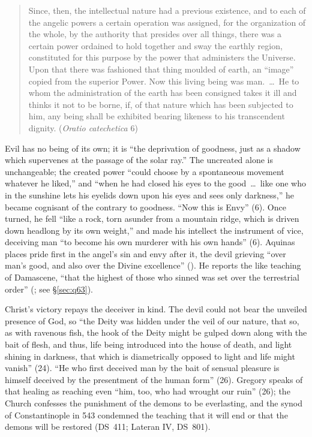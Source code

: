 \begin{quote}
Since, then, the intellectual nature had a previous existence, and to
each of the angelic powers a certain operation was assigned, for the
organization of the whole, by the authority that presides over all
things, there was a certain power ordained to hold together and sway the
earthly region, constituted for this purpose by the power that
administers the Universe. Upon that there was fashioned that thing
moulded of earth, an ``image'' copied from the superior Power. Now this
living being was man.~\dots\ He to whom the administration of the earth
has been consigned takes it ill and thinks it not to be borne, if, of
that nature which has been subjected to him, any being shall be exhibited
bearing likeness to his transcendent dignity. (\emph{Oratio catechetica}
6)
\end{quote}

\noindent Evil has no being of its own; it is ``the deprivation of
goodness, just as a shadow which supervenes at the passage of the solar
ray.'' The uncreated alone is unchangeable; the created power ``could
choose by a spontaneous movement whatever he liked,'' and ``when he had
closed his eyes to the good~\dots\ like one who in the sunshine lets his
eyelids down upon his eyes and sees only darkness,'' he became cognisant
of the contrary to goodness. ``Now this is Envy'' (6). Once turned, he
fell ``like a rock, torn asunder from a mountain ridge, which is driven
down headlong by its own weight,'' and made his intellect the instrument
of vice, deceiving man ``to become his own murderer with his own hands''
(6). Aquinas places pride first in the angel's sin and envy after it, the
devil grieving ``over man's good, and also over the Divine excellence''
(). He reports the like teaching of Damascene, ``that
the highest of those who sinned was set over the terrestrial order''
(; see \S\ref{sec:q63}).

Christ's victory repays the deceiver in kind. The devil could not bear
the unveiled presence of God, so ``the Deity was hidden under the veil of
our nature, that so, as with ravenous fish, the hook of the Deity might
be gulped down along with the bait of flesh, and thus, life being
introduced into the house of death, and light shining in darkness, that
which is diametrically opposed to light and life might vanish'' (24). ``He
who first deceived man by the bait of sensual pleasure is himself deceived
by the presentment of the human form'' (26). Gregory speaks of that
healing as reaching even ``him, too, who had wrought our ruin'' (26); the
Church confesses the punishment of the demons to be everlasting, and the
synod of Constantinople in 543 condemned the teaching that it will end or
that the demons will be restored (DS~411; Lateran IV, DS~801).

